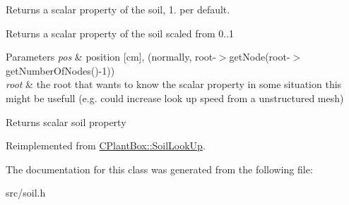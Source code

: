Returns a scalar property of the soil, 1. per default. 

Returns a scalar property of the soil scaled from 0..1


\begin{DoxyParams}{Parameters}
{\em pos} & position \mbox{[}cm\mbox{]}, (normally, root-\/$>$get\+Node(root-\/$>$get\+Number\+Of\+Nodes()-\/1)) \\
\hline
{\em root} & the root that wants to know the scalar property in some situation this might be usefull (e.\+g. could increase look up speed from a unstructured mesh) \\
\hline
\end{DoxyParams}
\begin{DoxyReturn}{Returns}
scalar soil property 
\end{DoxyReturn}


Reimplemented from \hyperlink{classCPlantBox_1_1SoilLookUp_a46ace0d168532b6eb9bec8e6a1d64814}{C\+Plant\+Box\+::\+Soil\+Look\+Up}.



The documentation for this class was generated from the following file\+:\begin{DoxyCompactItemize}
\item 
src/soil.\+h\end{DoxyCompactItemize}

